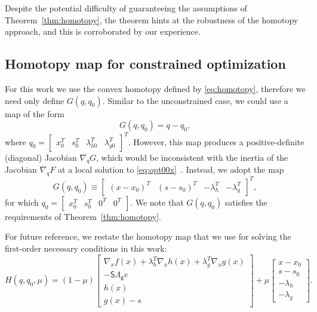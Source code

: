 Despite the potential difficulty of guaranteeing the assumptions of
Theorem~\ref{thm:homotopy}, the theorem hints at the robustness of the homotopy
approach, and this is corroborated by our experience.

\subsection{Homotopy map for constrained optimization}\label{sec:map}

For this work we use the convex homotopy defined by \eqref{eq:homotopy},
therefore we need only define $G(q,q_0)$.  Similar to the unconstrained case, we
could use a map of the form
\begin{equation*}
  G(q,q_0) = q - q_0,
\end{equation*}
where $q_0 = \begin{bmatrix} x_0^T & s_0^T & \lambda_{h0}^T &  \lambda_{g0}^T \end{bmatrix}^T$.  However, this map produces a
positive-definite (diagonal) Jacobian $\nabla_q G$, which would be inconsistent
with the inertia of the Jacobian $\nabla_q F$ at a local solution to
\eqref{eq:opt00x}~\cite{Nocedal2006NO}.  Instead, we adopt the map
\begin{equation*}
  G(q,q_0) \equiv \begin{bmatrix}
    (x - x_0)^T &
    (s - s_0)^T &
    -\lambda_h^T & 
    -\lambda_g^T
  \end{bmatrix}^T, 
\end{equation*}
for which $q_0 = \begin{bmatrix} x_0^T & s_0^T & 0^T & 0^T \end{bmatrix}$.
We note that $G(q,q_0)$ satisfies the requirements of
Theorem~\ref{thm:homotopy}. 

For future reference, we restate the homotopy map that we use for solving the
first-order necessary conditions in this work:
\begin{equation}\label{eq:homo0}
    H(q, q_0, \mu) = (1-\mu)
    \begin{bmatrix}
      \nabla_x f(x) +   \lambda_h^T \nabla_x h(x)  +  \lambda_g^T \nabla_x g(x) \\
      -\mathsf{S}\mathsf{\Lambda_g} e \\
      h(x) \\
      g(x) - s 
    \end{bmatrix}
    + \mu
    \begin{bmatrix}
      x - x_0 \\
      s - s_0 \\
      -\lambda_h \\
      -\lambda_g
    \end{bmatrix}.
\end{equation}

